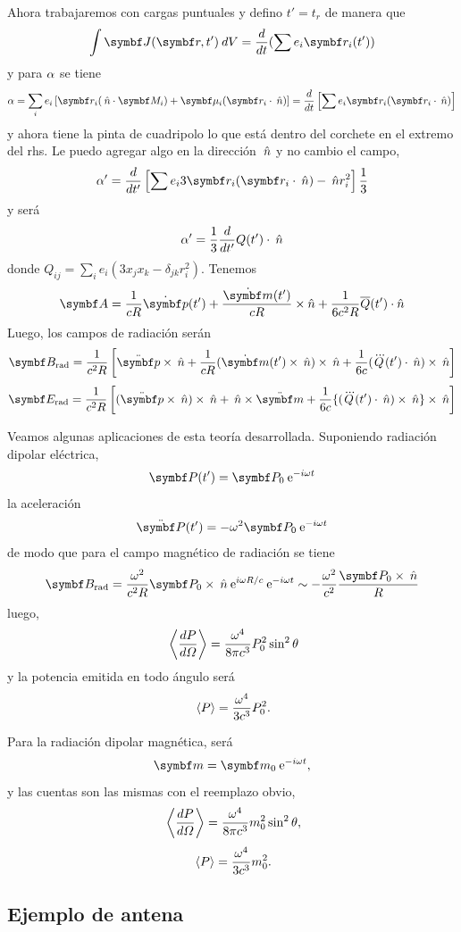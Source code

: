 \documentclass[10pt,oneside]{CBFT_book}
\begin{document}
Ahora trabajaremos con cargas puntuales y defino $t'= t_r $ de manera que
\[
	\int \vb{J}(\vb r,t') \: dV = \dtot{}{t}( \sum e_i \vb{r}_i(t') )
\]
y para $\alpha$ se tiene
\[
	\a = \sum_i e_i \left[ \vb{r}_i (\nver\cdot\vb{M}_i) + \vb{\mu}_i(\vb{r}_i\cdot\nver) \right]=
	\dtot{}{t}\left[ \sum e_i \vb{r}_i( \vb{r}_i\cdot\nver )\right]
\]
y ahora tiene la pinta de cuadripolo lo que está dentro del corchete en el extremo del rhs.
Le puedo agregar algo en la dirección $\:\hat{n}$ y no cambio el campo,
\[
	\a' = \dtot{}{t'} \left[ \sum e_i 3 \vb{r}_i( \vb{r}_i\cdot\nver) - \nver r^2_i \right] \frac{1}{3}
\]
y será
\[
	\alpha'= \frac{1}{3} \frac{d^{\hspace{-0.05em}} {}}{d {t'}^{\hspace{-0.05em}}} Q(t')\cdot\:\hat{n}
\]
donde $Q_{ij} = \sum_i e_i( 3 x_jx_k - \delta_{jk}r_i^2)$.
Tenemos
\[
	\vb{A} = \frac{1}{cR} \dot{\vb{p}}(t') + \frac{\dot{\vb{m}}(t')}{cR} \times \hat{n} + 
	\frac{1}{6c^2R} {\overline{Q}}(t') \cdot \hat{n}
\]
Luego, los campos de radiación serán
\[
	\vb{B}_\text{rad} = \frac{1}{c^2R}
	\left[ 
	\ddot{ \vb{p} } \times \nver + \frac{1}{cR} (\dot{\vb m}(t')\times\nver) \times \nver + 
	\frac{1}{6c} ( \dddot{Q}(t')\cdot\nver )\times \nver 
	\right]
\]
\[
	\vb{E}_\text{rad} = \frac{1}{c^2R}
	\left[ 
	( \ddot{ \vb{p} } \times \nver ) \times \nver + 
	\nver \times \ddot{\vb m} +
	\frac{1}{6c} \{ ( \dddot{Q}(t')\cdot\nver )\times \nver \}\times \nver
	\right]
\]

Veamos algunas aplicaciones de esta teoría desarrollada.
Suponiendo radiación dipolar eléctrica,
\[
	\vb{P}(t') = \vb{P}_0 \euler^{ - i \omega t }
\]
la aceleración
\[
	\ddot{ \vb{P} }(t') = - \omega^2 \vb{P}_0 \euler^{ - i \omega t }
\]
de modo que para el campo magnético de radiación se tiene 
\[
	\vb{B}_\text{rad} = \frac{\omega^2}{c^2R} \vb{P}_0\times\nver \euler^{i \omega R/c} \euler^{ - i \omega t }
	\sim - \frac{\omega^2}{c^2} \frac{ \vb{P}_0\times\nver }{R}
\]
luego,
\[
	\:\left\langle  \frac{d^{\hspace{-0.05em}} {P}}{d {\Omega}^{\hspace{-0.05em}}}  \right\rangle = \frac{ \omega^4 }{ 8 \pi c^3 } P_0^2 \sin^2\theta
\]
y la potencia emitida en todo ángulo será
\[
	\:\left\langle P \right\rangle = \frac{ \omega^4 }{ 3 c^3 } P_0^2.
\]

Para la radiación dipolar magnética, será
\[
	\vb{m} = \vb{m}_0 \euler^{ - i \omega t },
\]
y las cuentas son las mismas con el reemplazo obvio,
\[
	\:\left\langle  \frac{d^{\hspace{-0.05em}} {P}}{d {\Omega}^{\hspace{-0.05em}}}  \right\rangle = \frac{ \omega^4 }{ 8 \pi c^3 } m_0^2 \sin^2\theta,
\]
\[
	\:\left\langle P \right\rangle = \frac{ \omega^4 }{ 3 c^3 } m_0^2.
\]


\subsection{Ejemplo de antena}
\end{document}
